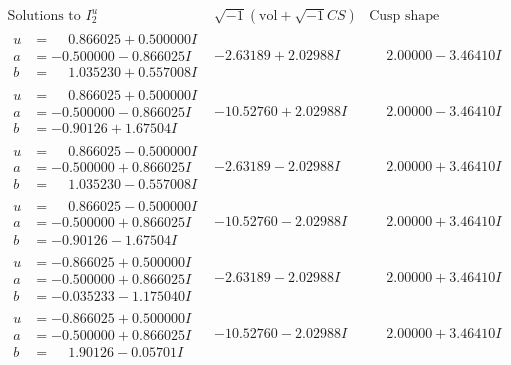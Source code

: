 \documentclass[1p]{elsarticle_modified}
\theoremstyle{definition}
\newcommand{\I}{\sqrt{-1}}
\begin{document}
$$\begin{array}{c|c|c}  
\text{Solutions to }I^u_{2}& \I (\text{vol} + \sqrt{-1}CS) & \text{Cusp shape}\\
 \hline 
\begin{aligned}
u &= \phantom{-}0.866025 + 0.500000 I \\
a &= -0.500000 - 0.866025 I \\
b &= \phantom{-}1.035230 + 0.557008 I\end{aligned}
 & -2.63189 + 2.02988 I & \phantom{-}2.00000 - 3.46410 I \\ \hline\begin{aligned}
u &= \phantom{-}0.866025 + 0.500000 I \\
a &= -0.500000 - 0.866025 I \\
b &= -0.90126 + 1.67504 I\end{aligned}
 & -10.52760 + 2.02988 I & \phantom{-}2.00000 - 3.46410 I \\ \hline\begin{aligned}
u &= \phantom{-}0.866025 - 0.500000 I \\
a &= -0.500000 + 0.866025 I \\
b &= \phantom{-}1.035230 - 0.557008 I\end{aligned}
 & -2.63189 - 2.02988 I & \phantom{-}2.00000 + 3.46410 I \\ \hline\begin{aligned}
u &= \phantom{-}0.866025 - 0.500000 I \\
a &= -0.500000 + 0.866025 I \\
b &= -0.90126 - 1.67504 I\end{aligned}
 & -10.52760 - 2.02988 I & \phantom{-}2.00000 + 3.46410 I \\ \hline\begin{aligned}
u &= -0.866025 + 0.500000 I \\
a &= -0.500000 + 0.866025 I \\
b &= -0.035233 - 1.175040 I\end{aligned}
 & -2.63189 - 2.02988 I & \phantom{-}2.00000 + 3.46410 I \\ \hline\begin{aligned}
u &= -0.866025 + 0.500000 I \\
a &= -0.500000 + 0.866025 I \\
b &= \phantom{-}1.90126 - 0.05701 I\end{aligned}
 & -10.52760 - 2.02988 I & \phantom{-}2.00000 + 3.46410 I \\ \hline\begin{aligned}

\end{aligned}
\end{array}$$
\end{document}
